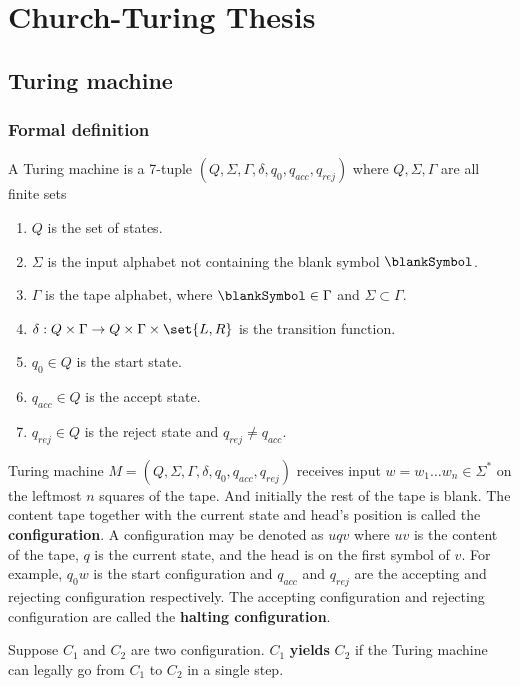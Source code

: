 \chapter{Church-Turing Thesis}
\section{Turing machine}
\subsection{Formal definition}
\begin{definition}
    A Turing machine is a 7-tuple \((Q,\Sigma,\Gamma,\delta,q_0,q_{acc},q_{rej})\) where \(Q,\Sigma,\Gamma\) are all finite sets 
    \begin{enumerate}
        \item \(Q\) is the set of states.
        \item \(\Sigma\) is the input alphabet not containing the blank symbol \(\blankSymbol\).
        \item \(\Gamma\) is the tape alphabet, where \(\blankSymbol \in \Gamma\) and \(\Sigma \subset \Gamma\).
        \item \(\delta: Q \times \Gamma \to Q \times \Gamma \times \set{L,R}\) is the transition function. 
        \item \(q_0 \in Q\) is the start state.
        \item \(q_{acc} \in Q\) is the accept state. 
        \item \(q_{rej} \in Q\) is the reject state and \(q_{rej} \neq q_{acc}\).
    \end{enumerate}
\end{definition}
Turing machine \(M = (Q,\Sigma,\Gamma,\delta,q_0,q_{acc},q_{rej})\) receives input \(w = w_1 \dots w_n \in \Sigma^{\ast}\) on the leftmost \(n\) squares of the tape. And initially the rest of the tape is blank. The content tape together with the current state and head's position is called the \textbf{configuration}. A configuration may be denoted as \(uqv\) where \(uv\) is the content of the tape, \(q\) is the current state, and the head is on the first symbol of \(v\). For example, \(q_0w\) is the start configuration and \(q_{acc}\) and \(q_{rej}\) are the accepting and rejecting configuration respectively. The accepting configuration and rejecting configuration are called the \textbf{halting configuration}.

Suppose \(C_1\) and \(C_2\) are two configuration. \(C_1\) \textbf{yields} \(C_2\) if the Turing machine can legally go from \(C_1\) to \(C_2\) in a single step. 

